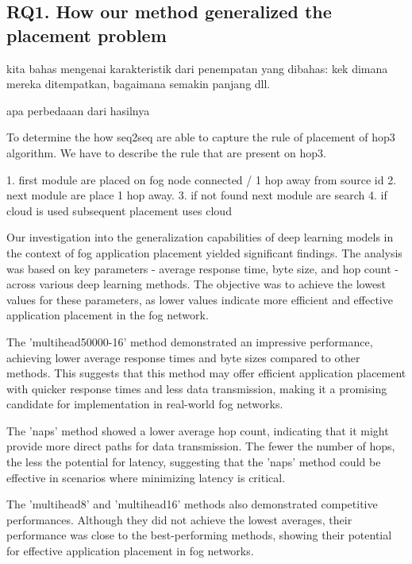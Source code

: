 \documentclass[conference]{IEEEtran}
\begin{document}
\subsection*{RQ1. How our method generalized the placement problem}





kita bahas mengenai karakteristik dari penempatan yang dibahas: kek dimana mereka ditempatkan, bagaimana semakin panjang dll. 

apa perbedaaan dari hasilnya 


To determine the how seq2seq are able to capture the rule of placement of hop3 algorithm. We have to describe the rule that are present on hop3.

1. first module are placed on fog node connected / 1 hop away from source id
2. next module are place 1 hop away. 
3. if not found next module are search 
4. if cloud is used subsequent placement uses cloud







Our investigation into the generalization capabilities of deep learning models in the context of fog application placement yielded significant findings. The analysis was based on key parameters - average response time, byte size, and hop count - across various deep learning methods. The objective was to achieve the lowest values for these parameters, as lower values indicate more efficient and effective application placement in the fog network.

The 'multihead50000-16' method demonstrated an impressive performance, achieving lower average response times and byte sizes compared to other methods. This suggests that this method may offer efficient application placement with quicker response times and less data transmission, making it a promising candidate for implementation in real-world fog networks.

The 'naps' method showed a lower average hop count, indicating that it might provide more direct paths for data transmission. The fewer the number of hops, the less the potential for latency, suggesting that the 'naps' method could be effective in scenarios where minimizing latency is critical.

The 'multihead8' and 'multihead16' methods also demonstrated competitive performances. Although they did not achieve the lowest averages, their performance was close to the best-performing methods, showing their potential for effective application placement in fog networks.
\end{document}
